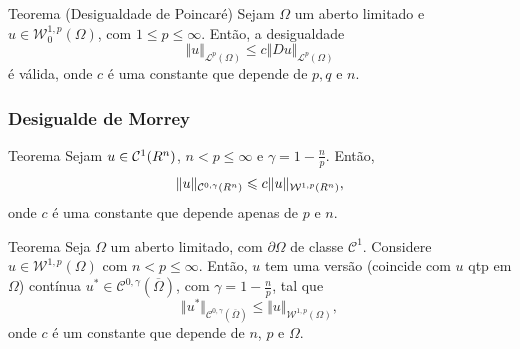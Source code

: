 \documentclass[xcolor=dvipsnames, aspectratio=169, 10pt]{beamer}
\let\mathbb\relax
\newcommand{\bR}{\mathbb{R}}
\newcommand{\cC}{\mathcal{C}}
\newcommand{\cL}{\mathcal{L}}
\newcommand{\cW}{\mathcal{W}}
\begin{document}
\begin{frame}
    \begin{block}{Teorema (Desigualdade de Poincaré)}
        Sejam $\Omega$ um aberto limitado e $u \in \cW^{1,p}_0(\Omega)$, com $1 \leqslant p \leqslant \infty$. Então, a desigualdade
   \[
        \Vert u \Vert_{\cL^p(\Omega)} \leqslant c\Vert Du \Vert_{\cL^p(\Omega)}
   \]
   é válida,
   onde $c$ é uma constante que depende de $p, q$ e $n$.
    \end{block}
\end{frame}
\begin{frame}
    \frametitle{Desigualde de Morrey}
    \begin{block}{Teorema}
         Sejam $u \in \cC^1(\bR^n)$, $n < p \leqslant \infty$ e $\gamma = 1 - \frac{n}{p}$. Então,
        \[
            \Vert u \Vert_{\cC^{0,\gamma}(\bR^n)} \leqslant c \Vert u \Vert_{\cW^{1,p}(\bR^n)},
        \]
        onde $c$ é uma constante que depende apenas de $p$ e $n$.
    \end{block}
\end{frame}
\begin{frame}
    \begin{block}{Teorema}
        Seja $\Omega$ um aberto limitado, com $\partial\Omega$ de classe $\cC^1$.
        Considere $u \in \cW^{1,p}(\Omega)$ com $n < p \leqslant \infty$.
        Então, $u$ tem uma versão (coincide com $u$ qtp em $\Omega$) contínua $u^* \in \cC^{0,\gamma}(\overline\Omega)$, com $\gamma = 1 - \frac{n}{p}$, tal que
        \[
            \Vert u^*  \Vert_{\cC^{0,\gamma}(\overline\Omega)} \leqslant \Vert u \Vert_{\cW^{1,p}(\Omega)},
        \]
        onde $c$ é um constante que depende de $n$, $p$ e $\Omega$.
    \end{block}
\end{frame}
\end{document}
